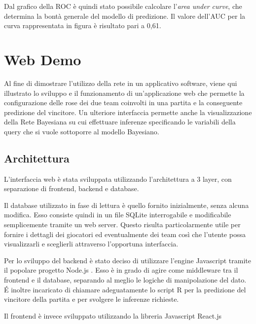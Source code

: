 \documentclass[hidelinks, 12pt]{article}
\begin{document}
Dal grafico della ROC è quindi stato possibile calcolare l'\textit{area under curve}, che determina la bontà generale del modello di predizione. Il valore dell'AUC per la curva rappresentata in figura è risultato pari a 0,61.




\clearpage



\section{Web Demo}
\label{sec:ui}

Al fine di dimostrare l'utilizzo della rete in un applicativo software, viene qui illustrato lo sviluppo e il funzionamento di un'applicazione web che permette la configurazione delle rose dei due team coinvolti in una partita e la conseguente predizione del vincitore. Un ulteriore interfaccia permette anche la visualizzazione della Rete Bayesiana su cui effettuare inferenze specificando le variabili della query che si vuole sottoporre al modello Bayesiano.



\subsection{Architettura}

L'interfaccia web è stata sviluppata utilizzando l'architettura a 3 layer, con separazione di frontend, backend e database.

Il database utilizzato in fase di lettura è quello fornito inizialmente, senza alcuna modifica. Esso consiste quindi in un file SQLite interrogabile e modificabile semplicemente tramite un web server. Questo risulta particolarmente utile per fornire i dettagli dei giocatori ed eventualmente dei team così che l'utente possa visualizzarli e sceglierli attraverso l'opportuna interfaccia.

Per lo sviluppo del backend è stato deciso di utilizzare l'engine Javascript tramite il popolare progetto Node.js \cite{site:nodejs}. Esso è in grado di agire come middleware tra il frontend e il database, separando al meglio le logiche di manipolazione del dato. \'E inoltre incaricato di chiamare adeguatamente lo script R per la predizione del vincitore della partita e per svolgere le inferenze richieste.

Il frontend è invece sviluppato utilizzando la libreria Javascript React.js \cite{site:react}
\end{document}
